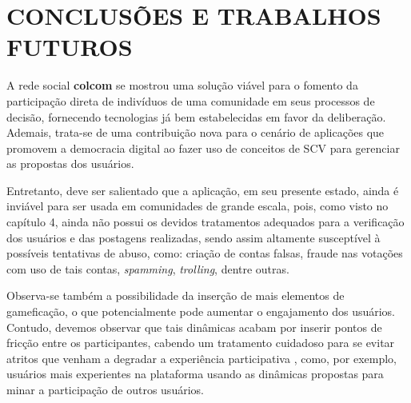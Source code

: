 \section{CONCLUSÕES E TRABALHOS FUTUROS}

    


A rede social \textbf{colcom} se mostrou uma solução viável para o fomento da participação direta de indivíduos de uma comunidade em seus processos de decisão, fornecendo tecnologias já bem estabelecidas em favor da deliberação. Ademais, trata-se de uma contribuição nova para o cenário de aplicações que promovem a democracia digital ao fazer uso de conceitos de SCV para gerenciar as propostas dos usuários.


Entretanto, deve ser salientado que a aplicação, em seu presente estado, ainda é inviável para ser usada em comunidades de grande escala, pois, como visto no capítulo 4, ainda não possui os devidos tratamentos adequados para a verificação dos usuários e das postagens realizadas, sendo assim altamente susceptível à possíveis tentativas de abuso, como: criação de contas falsas, fraude nas votações com uso de tais contas, \textit{spamming}, \textit{trolling}, dentre outras.

Observa-se também a possibilidade da inserção de mais elementos de gameficação, o que potencialmente pode aumentar o engajamento dos usuários. Contudo, devemos observar que tais dinâmicas acabam por inserir pontos de fricção entre os participantes, cabendo um tratamento cuidadoso para se evitar atritos que venham a degradar a experiência participativa \cite{friction}, como, por exemplo, usuários mais experientes na plataforma usando as dinâmicas propostas para minar a participação de outros usuários.
 
